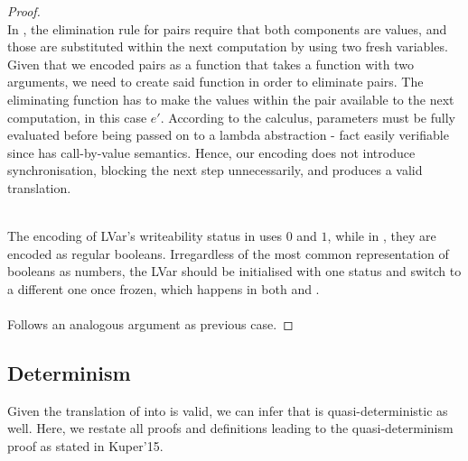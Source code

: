 \documentclass[main.tex]{subfiles}
\begin{document}
\begin{proof}
   \\
  In \typedlvar, the elimination rule for pairs require that both components are 
  values, and those are substituted within the next computation by using two
  fresh variables. Given that we encoded pairs as a function that takes a
  function with two arguments, we need to create said function in order to
  eliminate pairs. The eliminating function has to make the values within the
  pair available to the next computation, in this case $e'$. According to the
  \lvar calculus, parameters must be fully evaluated before being passed on to a
  lambda abstraction - fact easily verifiable since \lvar \mspc has call-by-value
  semantics. Hence, our encoding does not introduce synchronisation, blocking
  the next step unnecessarily, and produces a valid translation. \\
  


   \\
  The encoding of LVar's writeability status in \typedlvar uses $0$ and $1$,
  while in \lvar, they are encoded as regular booleans. Irregardless of the most
  common representation of booleans as numbers, the LVar should be initialised
  with one status and switch to a different one once frozen, which happens in
  both \lvar and \typedlvar.\\

  \\
  Follows an analogous argument as previous case.
  
\end{proof}


\subsection{Determinism}

Given the translation of \typedlvar \mspc into \lvar \mspc is valid, we can infer that
\typedlvar \mspc is quasi-deterministic as well. Here, we restate all proofs and
definitions leading to the quasi-determinism proof as stated in Kuper'15.
\end{document}
